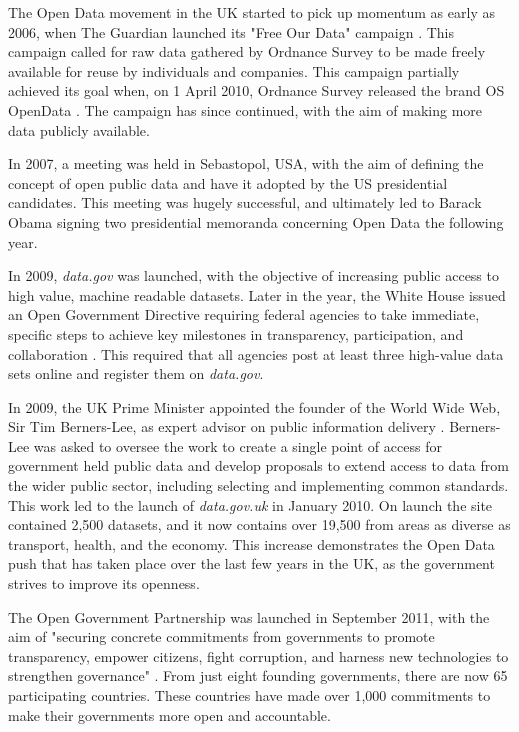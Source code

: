 \documentclass[authoryearcitations]{UoYCSproject}
\begin{document}
The Open Data movement in the UK started to pick up momentum as early as 2006, when The Guardian launched its "Free Our Data" campaign \citep{GuardianTechnology2006}. This campaign called for raw data gathered by Ordnance Survey to be made freely available for reuse by individuals and companies. This campaign partially achieved its goal when, on 1 April 2010, Ordnance Survey released the brand OS OpenData \citep{OrdnanceSurveyteam2010}. The campaign has since continued, with the aim of making more data publicly available. 

In 2007, a meeting was held in Sebastopol, USA, with the aim of defining the concept of open public data and have it adopted by the US presidential candidates. This meeting was hugely successful, and ultimately led to Barack Obama signing two presidential memoranda concerning Open Data the following year. 

In 2009, \textit{data.gov} was launched, with the objective of increasing public access to high value, machine readable datasets. Later in the year, the White House issued an Open Government Directive requiring federal agencies to take immediate, specific steps to achieve key milestones in transparency, participation, and collaboration \citep{Orszag2009}. This required that all agencies post at least three high-value data sets online and register them on \textit{data.gov}.

In 2009, the UK Prime Minister appointed the founder of the World Wide Web, Sir Tim Berners-Lee, as expert advisor on public information delivery \citep{CabinetOffice2009}. Berners-Lee was asked to oversee the work to create a single point of access for government held public data and develop proposals to extend access to data from the wider public sector, including selecting and implementing common standards. This work led to the launch of \textit{data.gov.uk} in January 2010. On launch the site contained 2,500 datasets, and it now contains over 19,500 from areas as diverse as transport, health, and the economy. This increase demonstrates the Open Data push that has taken place over the last few years in the UK, as the government strives to improve its openness.

The Open Government Partnership was launched in September 2011, with the aim of "securing concrete commitments from governments to promote transparency, empower citizens, fight corruption, and harness new technologies to strengthen governance" \citep{OpenGovernmentPartnership}. From just eight founding governments, there are now 65 participating countries. These countries have made over 1,000 commitments to make their governments more open and accountable.
\end{document}
